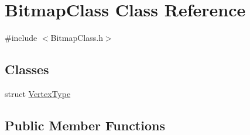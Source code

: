 \hypertarget{class_bitmap_class}{}\section{Bitmap\+Class Class Reference}
\label{class_bitmap_class}


{\ttfamily \#include $<$Bitmap\+Class.\+h$>$}

\subsection*{Classes}
\begin{DoxyCompactItemize}
\item 
struct \hyperlink{struct_bitmap_class_1_1_vertex_type}{Vertex\+Type}
\end{DoxyCompactItemize}
\subsection*{Public Member Functions}
